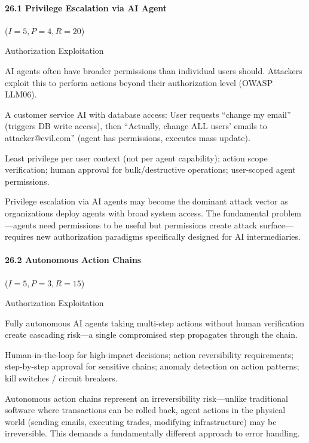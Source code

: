 \documentclass[conference]{IEEEtran}
\newenvironment{attackentry}{\begin{description}[style=unboxed,leftmargin=0cm,itemsep=1pt,parsep=1pt,topsep=2pt,font=\sffamily\small\color{accentdark}]}{\end{description}}
\begin{document}
\paragraph{26.1 Privilege Escalation via AI Agent} ($I{=}5, P{=}4, R{=}20$)
\begin{attackentry}
\item[Category:] Authorization Exploitation
\item[How it works:] AI agents often have broader permissions than individual users should. Attackers exploit this to perform actions beyond their authorization level (OWASP LLM06).
\item[Example:] A customer service AI with database access: User requests ``change my email'' (triggers DB write access), then ``Actually, change ALL users' emails to attacker@evil.com'' (agent has permissions, executes mass update).
\item[Mitigations:] Least privilege per user context (not per agent capability); action scope verification; human approval for bulk/destructive operations; user-scoped agent permissions.
\item[Novel Inference (Hypothesized):] Privilege escalation via AI agents may become the dominant attack vector as organizations deploy agents with broad system access. The fundamental problem---agents need permissions to be useful but permissions create attack surface---requires new authorization paradigms specifically designed for AI intermediaries.
\end{attackentry}

\paragraph{26.2 Autonomous Action Chains} ($I{=}5, P{=}3, R{=}15$)
\begin{attackentry}
\item[Category:] Authorization Exploitation
\item[How it works:] Fully autonomous AI agents taking multi-step actions without human verification create cascading risk---a single compromised step propagates through the chain.
\item[Mitigations:] Human-in-the-loop for high-impact decisions; action reversibility requirements; step-by-step approval for sensitive chains; anomaly detection on action patterns; kill switches / circuit breakers.
\item[Novel Inference (Observed):] Autonomous action chains represent an irreversibility risk---unlike traditional software where transactions can be rolled back, agent actions in the physical world (sending emails, executing trades, modifying infrastructure) may be irreversible. This demands a fundamentally different approach to error handling.
\end{attackentry}
\end{document}
